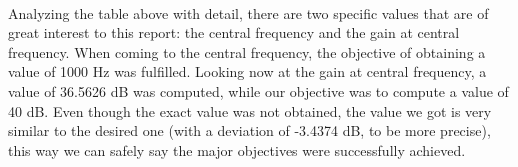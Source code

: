\paragraph{}Analyzing the table above with detail, there are two specific values that are of great interest to this report: the central frequency and the gain at central frequency. When coming to the central frequency, the objective of obtaining a value of 1000 Hz was fulfilled. Looking now at the gain at central frequency, a value of  36.5626 dB was computed, while our objective was to compute a value of 40 dB. Even though the exact value was not obtained, the value we got is very similar to the desired one (with a deviation of -3.4374 dB, to be more precise), this way we can safely say the major objectives were successfully achieved.


